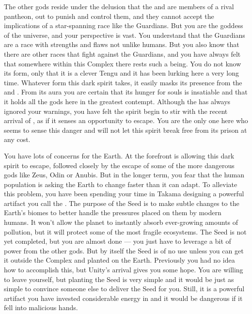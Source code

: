 \documentclass[char]{guardians}
\begin{document}
The other gods reside under the delusion that the \cCaretaker{} and \cWarden{} are members of a rival pantheon, out to punish and control them, and they cannot accept the implications of a star-spanning race like the Guardians. But you are the goddess of the universe, and your perspective is vast. You understand that the Guardians are a race with strengths and flaws not unlike humans. But you also know that there are other races that fight against the Guardians, and you have always felt that somewhere within this Complex there rests such a being. You do not know its form, only that it is a clever Tengu and it has been lurking here a very long time. Whatever form this dark spirit takes, it easily masks its presence from the \cWarden{} and \cCaretaker{}. From its aura you are certain that its hunger for souls is insatiable and that it holds all the gods here in the greatest contempt. Although the \cWarden{} has always ignored your warnings, you have felt the spirit begin to stir with the recent arrival of \cUnity{}, as if it senses an opportunity to escape. You are the only one here who seems to sense this danger and will not let this spirit break free from its prison at any cost.

You have lots of concerns for the Earth. At the forefront is allowing this dark spirit to escape, followed closely by the escape of some of the more dangerous gods like Zeus, Odin or Anubis. But in the longer term, you fear that the human population is asking the Earth to change faster than it can adapt. To alleviate this problem, you have been spending your time in Takama designing a powerful artifact you call the \iSeed{\MYname}. The purpose of the Seed is to make subtle changes to the Earth's biomes to better handle the pressures placed on them by modern humans. It won't allow the planet to instantly absorb ever-growing amounts of pollution, but it will protect some of the most fragile ecosystems. The Seed is not yet completed, but you are almost done --- you just have to leverage a bit of power from the other gods. But by itself the Seed is of no use unless you can get it outside the Complex and planted on the Earth. Previously you had no idea how to accomplish this, but Unity's arrival gives you some hope. You are willing to leave yourself, but planting the Seed is very simple and it would be just as simple to convince someone else to deliver the Seed for you. Still, it is a powerful artifact you have invested considerable energy in and it would be dangerous if it fell into malicious hands.
\end{document}
